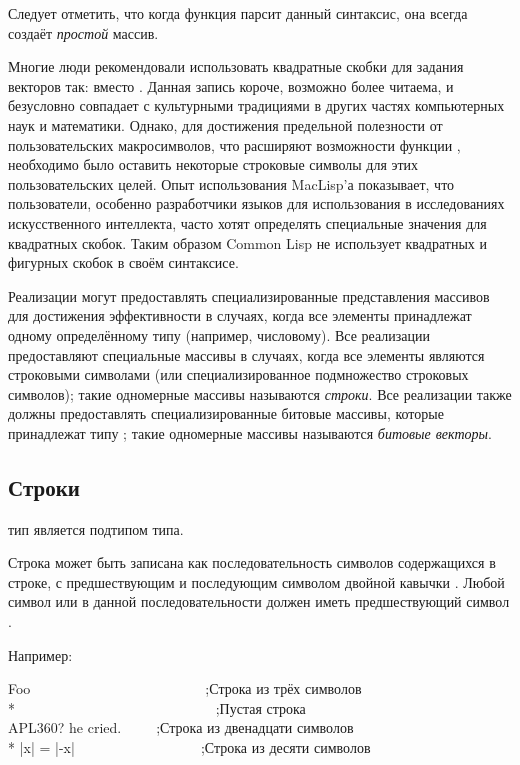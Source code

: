 Следует отметить, что когда функция  парсит данный синтаксис, она
всегда создаёт \emph{простой} массив.

\beforenoterule
\begin{rationale}
Многие люди рекомендовали использовать квадратные скобки для задания векторов
так:  вместо . Данная запись
короче, возможно более читаема, и безусловно совпадает с культурными традициями
в других частях компьютерных наук и математики. Однако, для достижения
предельной полезности от пользовательских макросимволов, что расширяют
возможности функции , необходимо было оставить некоторые строковые
символы для этих пользовательских целей. Опыт использования MacLisp'а
показывает, что пользователи, особенно разработчики языков для использования в
исследованиях искусственного интеллекта, часто хотят определять специальные
значения для квадратных скобок. Таким образом Common Lisp не использует
квадратных и фигурных скобок в своём синтаксисе.
\end{rationale}
\afternoterule

Реализации могут предоставлять специализированные представления массивов для
достижения эффективности в случаях, когда все элементы принадлежат одному
определённому типу (например, числовому). Все реализации предоставляют
специальные массивы в случаях, когда все элементы являются строковыми символами
(или специализированное подмножество строковых символов);
такие одномерные массивы называются \emph{строки}.
Все реализации также должны предоставлять специализированные битовые массивы,
которые принадлежат типу ;
такие одномерные массивы называются \emph{битовые векторы}.

\subsection{Строки}
\label{STRING-TYPE-SECTION}

 тип является подтипом  типа.

Строка может быть записана как последовательность символов содержащихся в
строке, с предшествующим и последующим символом двойной кавычки \cd{{\Xdquote}}.
Любой символ \cd{{\Xdquote}} или \cd{{\Xbackslash}} в данной последовательности должен
иметь предшествующий символ \cd{{\Xbackslash}}.

Например:
\begin{lisp}
{\Xdquote}Foo{\Xdquote}~~~~~~~~~~~~~~~~~~~~~~~~~;\textrm{Строка из трёх символов} \\*
{\Xdquote}{\Xdquote}~~~~~~~~~~~~~~~~~~~~~~~~~~~~;\textrm{Пустая строка} \\
{\Xdquote}{\Xbackslash}{\Xdquote}APL{\Xbackslash}{\Xbackslash}360?{\Xbackslash}{\Xdquote} he
cried.{\Xdquote}~~~~~;\textrm{Строка из двенадцати символов} \\*
{\Xdquote}|x| = |-x|{\Xdquote}~~~~~~~~~~~~~~~~~~;\textrm{Строка из десяти символов}
\end{lisp}

